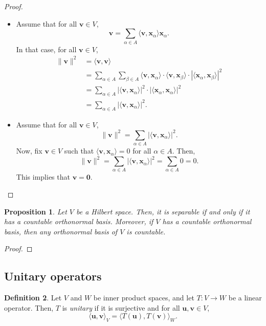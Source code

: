 \documentclass[a4paper, openany]{memoir}
\theoremstyle{definition}
\newtheorem{definition}{Definition}[section]
\theoremstyle{plain}
\newtheorem{proposition}[definition]{Proposition}
\begin{document}
\begin{proof}
\begin{itemize}
            \item Assume that for all $\bm{v} \in V$,
            \[\bm{v} = \sum_{\alpha \in A} \langle \bm{v}, \bm{x}_\alpha \rangle \bm{x}_\alpha.\]
            In that case, for all $\bm{v} \in V$,
            \begin{align*}
                \lVert \bm{v} \rVert^2 &= \langle \bm{v}, \bm{v} \rangle \\
                &= \sum_{\alpha \in A} \sum_{\beta \in A} \langle \bm{v}, \bm{x}_\alpha \rangle \cdot \langle \bm{v}, \bm{x}_\beta \rangle \cdot |\langle \bm{x}_\alpha, \bm{x}_\beta \rangle|^2 \\
                &= \sum_{\alpha \in A} |\langle \bm{v}, \bm{x}_\alpha \rangle|^2 \cdot |\langle \bm{x}_\alpha, \bm{x}_\alpha \rangle|^2 \\
                &= \sum_{\alpha \in A} |\langle \bm{v}, \bm{x}_\alpha \rangle|^2.
            \end{align*}
            
            \item Assume that for all $\bm{v} \in V$,
            \[\lVert \bm{v} \rVert^2 = \sum_{\alpha \in A} |\langle \bm{v}, \bm{x}_\alpha \rangle|^2.\]
            Now, fix $\bm{v} \in V$ such that $\langle \bm{v}, \bm{x}_\alpha \rangle = 0$ for all $\alpha \in A$. Then,
            \[\lVert \bm{v} \rVert^2 = \sum_{\alpha \in A} |\langle \bm{v}, \bm{x}_\alpha \rangle|^2 = \sum_{\alpha \in A} 0 = 0.\]
            This implies that $\bm{v} = \bm{0}$.
        \end{itemize}
    \end{proof}

    \begin{proposition}
        Let $V$ be a Hilbert space. Then, it is separable if and only if it has a countable orthonormal basis. Moreover, if $V$ has a countable orthonormal basis, then any orthonormal basis of $V$ is countable.
    \end{proposition}
    \begin{proof}
    \end{proof}
    
    \subsection{Unitary operators}
    \begin{definition}
        Let $V$ and $W$ be inner product spaces, and let $T: V \to W$ be a linear operator. Then, $T$ is \emph{unitary} if it is surjective and for all $\bm{u}, \bm{v} \in V$,
        \[\langle \bm{u}, \bm{v} \rangle_V = \langle T(\bm{u}), T(\bm{v}) \rangle_W.\]
    \end{definition}
\end{document}
